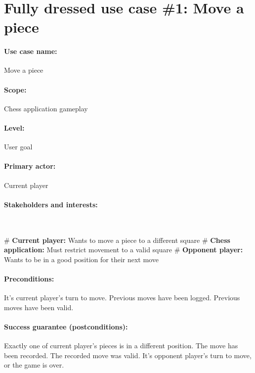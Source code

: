 \documentclass{article}
\begin{document}
\section*{Fully dressed use case \#1: Move a piece}

\paragraph{Use case name:} Move a piece

\paragraph{Scope:} Chess application gameplay

\paragraph{Level:} User goal

\paragraph{Primary actor:} Current player

\paragraph{Stakeholders and interests:}\mbox{}\\
\begin{easylist}[itemize]
# \textbf{Current player:} Wants to move a piece to a different square
# \textbf{Chess application:} Must restrict movement to a valid square
# \textbf{Opponent player:} Wants to be in a good position for their next move
\end{easylist}

\paragraph{Preconditions:} It's current player's turn to move. Previous moves have been logged. Previous moves have been valid.

\paragraph{Success guarantee (postconditions):} Exactly one of current player's pieces is in a different position. The move has been recorded. The recorded move was valid. It's opponent player's turn to move, or the game is over.
\end{document}
